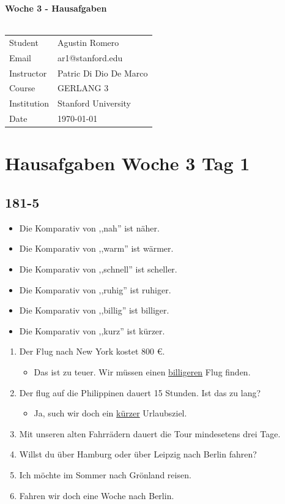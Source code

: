 \documentclass{article}
\begin{document}
\begin{center}
\textbf{\Large{Woche 3 - Hausafgaben}}\\~\\
\begin{tabular}{l l}
Student&Agustin Romero\\
Email&ar1@stanford.edu\\
Instructor&Patric Di Dio De Marco\\
Course&GERLANG 3\\
Institution&Stanford University\\
Date&\today\\
\end{tabular}
\end{center}
\section*{Hausafgaben Woche 3 Tag 1}
\subsection*{181-5}
\begin{itemize}
\item Die Komparativ von ,,nah'' ist näher.
\item Die Komparativ von ,,warm'' ist wärmer.
\item Die Komparativ von ,,schnell'' ist scheller.
\item Die Komparativ von ,,ruhig'' ist ruhiger.
\item Die Komparativ von ,,billig'' ist billiger.
\item Die Komparativ von ,,kurz'' ist kürzer.
\end{itemize}
\begin{enumerate}[label=(\alph*)]
\item Der Flug nach New York kostet 800 €. 
\begin{itemize}
\item Das ist zu teuer. Wir müssen einen \underline{billigeren} Flug finden.
\end{itemize}
\item Der flug auf die Philippinen dauert 15 Stunden. Ist das zu lang?
\begin{itemize}
\item Ja, such wir doch ein \underline{kürzer} Urlaubsziel.
\end{itemize}
\item Mit unseren alten Fahrrädern dauert die Tour mindesetens drei Tage.
\item Willst du über Hamburg oder über Leipzig nach Berlin fahren?
\item Ich möchte im Sommer nach Grönland reisen.
\item Fahren wir doch eine Woche nach Berlin.
\end{enumerate}
\end{document}
